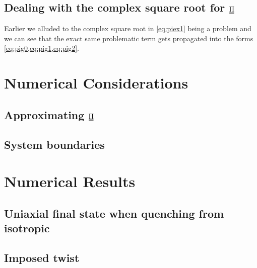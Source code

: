 \documentclass[12pt]{article}
\newcommand{\duf}[2]{\stackunder[0.5pt]{\stackunder[0.8pt]{\stackunder[1pt]{\ensuremath{#1}}{\rule{\widthof{\ensuremath{#2}}*\real{0.9}}{.1ex}}}{\rule{\widthof{\ensuremath{#2}}*\real{0.9}}{.1ex}}}{}}
\newcommand{\du}[1]{\duf{#1}{#1}}
\newcommand{\PP}{\ensuremath{\du{\Pi}}}
\begin{document}
    \subsection{Dealing with the complex square root for \PP}
        Earlier we alluded to the complex square root in \cref{eq:piex1} being a problem and we can see that the exact same problematic term gets propagated into the forms \cref{eq:pig0,eq:pig1,eq:pig2}.

\section{Numerical Considerations}
    \subsection{Approximating \PP{}}
    \subsection{System boundaries }

\section{Numerical Results}
    \subsection{Uniaxial final state when quenching from isotropic}
    \subsection{Imposed twist}
\end{document}
